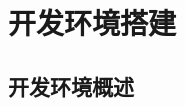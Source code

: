 \renewenvironment{longtable}{\rowcolors{2}{LightGray}{white}\oldlongtable} {\endoldlongtable}
\chapter{开发环境搭建}
\section{开发环境概述}



























